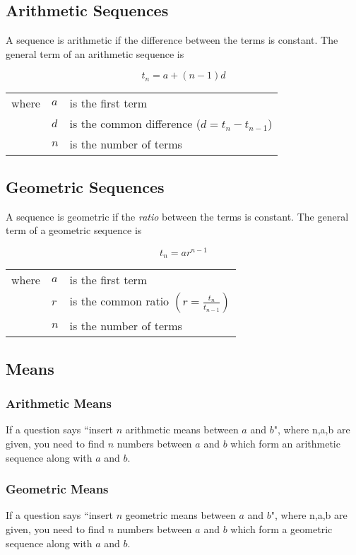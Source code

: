 \documentclass{article}
\numberwithin{equation}{section}
\begin{document}
\subsection{Arithmetic Sequences}

A sequence is arithmetic if the difference between the terms is constant. The general term of an arithmetic sequence is

\begin{equation}
	t_n = a + (n-1) d
\end{equation}

\begin{tabular}{l l l}
	where & $a$ &is the first term \\
	& $d$ &is the common difference ($d = t_n - t_{n-1}$) \\
	& $n$ &is the number of terms \\
\end{tabular}

\subsection{Geometric Sequences}

A sequence is geometric if the \emph{ratio} between the terms is constant. The general term of a geometric sequence is

\begin{equation}
	t_n = ar^{n-1} 
\end{equation}

\begin{tabular}{l l l}
	where & $a$ &is the first term \\
	& $r$ &is the common ratio $\left(r = \frac{t_n}{t_{n-1}} \right)$ \\
	& $n$ &is the number of terms \\
\end{tabular}

\subsection{Means}
\subsubsection{Arithmetic Means}
If a question says ``insert $n$ arithmetic means between $a$ and $b$", where n,a,b are given, you need to find $n$ numbers between $a$ and $b$ which form an arithmetic sequence along with $a$ and $b$.

\subsubsection{Geometric Means}
If a question says ``insert $n$ geometric means between $a$ and $b$", where n,a,b are given, you need to find $n$ numbers between $a$ and $b$ which form a geometric sequence along with $a$ and $b$.
\end{document}
